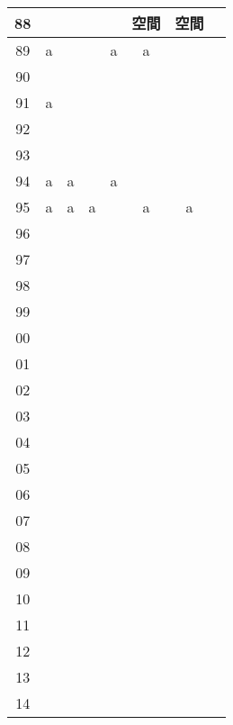 \documentclass[a4j]{jarticle}
\begin{document}
          \begin{tabular}{|c|c|c|c|c|c|c|c|} \hline
          88&&&&&空間&空間& \\ \hline
          89&a&&&a&a&& \\ \hline
          90&&&&&&& \\ \hline
          91&a&&&&&& \\ \hline
          92&&&&&&& \\ \hline
          93&&&&&&& \\ \hline
          94&a&a&&a&&& \\ \hline
          95&a&a&a&&a&a& \\ \hline
          96&&&&&&& \\ \hline
          97&&&&&&& \\ \hline
          98&&&&&&& \\ \hline
          99&&&&&&& \\ \hline
          00&&&&&&& \\ \hline
          01&&&&&&& \\ \hline
          02&&&&&&& \\ \hline
          03&&&&&&& \\ \hline
          04&&&&&&& \\ \hline
          05&&&&&&& \\ \hline
          06&&&&&&& \\ \hline
          07&&&&&&& \\ \hline
          08&&&&&&& \\ \hline
          09&&&&&&& \\ \hline
          10&&&&&&& \\ \hline
          11&&&&&&& \\ \hline
          12&&&&&&& \\ \hline
          13&&&&&&& \\ \hline
          14&&&&&&& \\ \hline
          \end{tabular}
\newpage 
\end{document}
